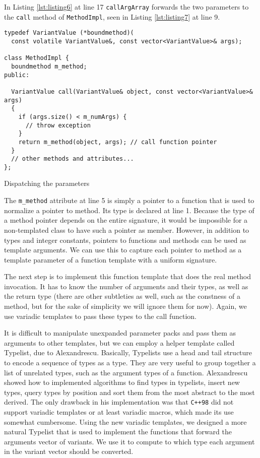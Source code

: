 In Listing \ref{lst:listing6} at line 17 \texttt{callArgArray} forwards the two parameters to the \texttt{call} method of
\texttt{MethodImpl}, seen in Listing \ref{lst:listing7} at line 9.

\begin{listing}[H]
\begin{verbatim}
typedef VariantValue (*boundmethod)(
  const volatile VariantValue&, const vector<VariantValue>& args);

class MethodImpl {
  boundmethod m_method;
public:

  VariantValue call(VariantValue& object, const vector<VariantValue>& args)
  {
    if (args.size() < m_numArgs) {
      // throw exception
    }
    return m_method(object, args); // call function pointer
  }
  // other methods and attributes...
};
\end{verbatim}
\caption{Dispatching the parameters}
\label{lst:listing7}
\end{listing}

The \texttt{m\_method} attribute at line 5 is simply a pointer to a function that is used to normalize a pointer to method.
Its type is declared at line 1. Because the type of a method pointer depends on the entire signature, it would be impossible
for a non-templated class to have such a pointer as member. However, in addition to types and integer constants, pointers to
functions and methods can be used as template arguments. We can use this to capture each pointer to method as a template
parameter of a function template with a uniform signature.

The next step is to implement this function template that does the real method invocation. It has to know the number of arguments
and their types, as well as the return type (there are other subtleties as well, such as the constness of a method,
but for the sake of simplicity we will ignore them for now). Again, we use variadic templates to pass these types to the call function.

It is difficult to manipulate unexpanded parameter packs and pass them as arguments to other templates, but we can employ a helper
template called Typelist, due to Alexandrescu\cite{Alexandrescu1}. Basically, Typelists use a head and tail structure to encode a sequence
of types as a type. They are very useful to group together a list of unrelated types, such as the argument types of a function.
Alexandrescu showed how to implemented algorithms to find types in typelists, insert new types, query types by position and sort
them from the most abstract to the most derived. The only drawback in his implementation was that \texttt{C++98} did not support
variadic templates or at least variadic macros, which made its use somewhat cumbersome. Using the new variadic templates, we designed
a more natural Typelist that is used to implement the functions that forward the arguments vector of variants. We use it to compute
to which type each argument in the variant vector should be converted.

